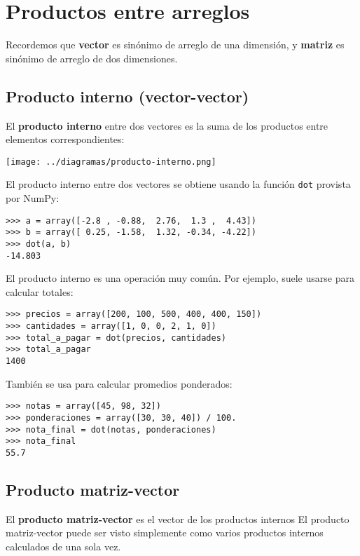 \section{Productos entre arreglos}

Recordemos que \textbf{vector} es sinónimo de arreglo de una dimensión,
y \textbf{matriz} es sinónimo de arreglo de dos dimensiones.

\subsection{Producto interno (vector-vector)}

El \textbf{producto interno} entre dos vectores es la suma de los
productos entre elementos correspondientes:

\texttt{[image: ../diagramas/producto-interno.png]}

El producto interno entre dos vectores se obtiene usando la función
\lstinline!dot! provista por NumPy:

\begin{lstlisting}
>>> a = array([-2.8 , -0.88,  2.76,  1.3 ,  4.43])
>>> b = array([ 0.25, -1.58,  1.32, -0.34, -4.22])
>>> dot(a, b)
-14.803
\end{lstlisting}

El producto interno es una operación muy común. Por ejemplo, suele
usarse para calcular totales:

\begin{lstlisting}
>>> precios = array([200, 100, 500, 400, 400, 150])
>>> cantidades = array([1, 0, 0, 2, 1, 0])
>>> total_a_pagar = dot(precios, cantidades)
>>> total_a_pagar
1400
\end{lstlisting}

También se usa para calcular promedios ponderados:

\begin{lstlisting}
>>> notas = array([45, 98, 32])
>>> ponderaciones = array([30, 30, 40]) / 100.
>>> nota_final = dot(notas, ponderaciones)
>>> nota_final
55.7
\end{lstlisting}

\subsection{Producto matriz-vector}

El \textbf{producto matriz-vector} es el vector de los productos
internos El producto matriz-vector puede ser visto simplemente como
varios productos internos calculados de una sola vez.

